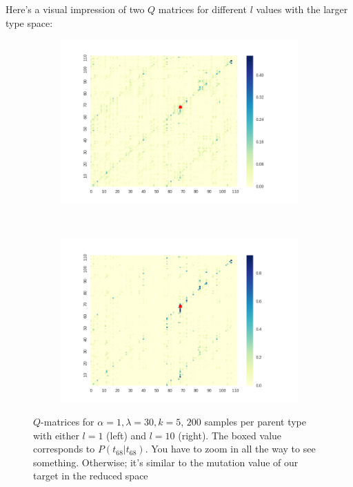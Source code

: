 \documentclass[a4paper]{article}
\begin{document}
Here's a visual impression of two $Q$ matrices for different $l$ values with the larger type space:

\begin{figure}[h!]
  \centering
  \begin{subfigure}[b]{0.45\textwidth}
    \includegraphics[scale=0.4]{../code-LOT-extension/plots/q-l30-a1-k5-l1-meFalse112.png}
  \end{subfigure}
  ~
   \begin{subfigure}[b]{0.45\textwidth}
    \includegraphics[scale=0.4]{../code-LOT-extension/plots/q-l30-a1-k5-l10-meFalse112.png}
  \end{subfigure}
  \caption{$Q$-matrices for $\alpha = 1, \lambda = 30, k = 5$, $200$ samples per parent type with either $l = 1$ (left) and $l = 10$ (right). The boxed value corresponds to $P(t_{68} | t_{68})$. You have to zoom in all the way to see something. Otherwise; it's similar to the mutation value of our target in the reduced space}
  \label{fig:q-matrices}
\end{figure}
\end{document}
